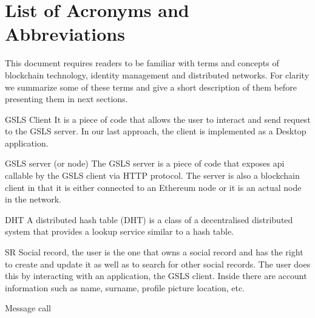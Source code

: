 \documentclass[12pt,twoside]{article}
\begin{document}
\clearpage

\tableofcontents

\section*{List of Acronyms and Abbreviations}
\label{list-of-acronyms-and-abbreviations}

This document requires readers to be familiar with terms and concepts of blockchain technology, identity management and distributed networks. For clarity we summarize some of these terms and give a short description of them before presenting them in next sections.

\begin{basedescript}{\desclabelstyle{\pushlabel}\desclabelwidth{10em}}
\item[GSLS Client]              It is a piece of code that allows the user to interact and send request to the GSLS server. In our last approach, the client is implemented as a Desktop application.
\item[GSLS server (or node)]    The GSLS server is a piece of code that exposes api callable by the GSLS client via HTTP protocol. The server is also a blockchain client in that it is either connected to an Ethereum node or it is an actual node in the network.
\item[DHT]                      A distributed hash table (DHT) is a class of a decentralised distributed system that provides a lookup service similar to a hash table.
\item[SR]                       Social record, the user is the one that owns a social record and has the right to create and update it as well as to search for other social records. The user does this by interacting with an application, the GSLS client. Inside there are account information such as name, surname, profile picture location, etc.
\item[Message call]
\end{basedescript}


\clearpage







\appendix

\end{document}
